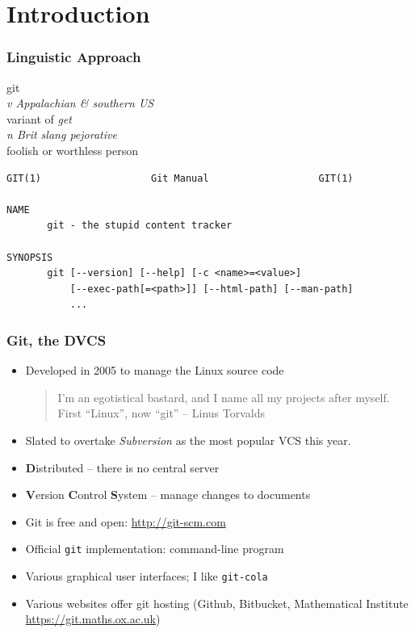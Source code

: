 
\section{Introduction}

\begin{frame}[fragile]
  \frametitle{Linguistic Approach}
  \vspace{-5mm}
  
  \begin{block}{}
    git \\
    \textit{v Appalachian \& southern US}\\
    \hspace{1cm} variant of \emph{get}\\
    \textit{n Brit slang pejorative}\\
    \hspace{1cm} foolish or worthless person
  \end{block}
  \bigskip
  \pause

  \small
\begin{verbatim}
GIT(1)                   Git Manual                   GIT(1)

NAME
       git - the stupid content tracker

SYNOPSIS
       git [--version] [--help] [-c <name>=<value>]
           [--exec-path[=<path>]] [--html-path] [--man-path]
           ...
\end{verbatim}

\end{frame}


\begin{frame}
  \frametitle{Git, the DVCS}

  \begin{itemize}
  \item 
    Developed in 2005 to manage the Linux source code
    \begin{quote}
      I'm an egotistical bastard, and I name all my projects after
      myself. First ``Linux'', now ``git'' -- Linus Torvalds
    \end{quote}
  \item Slated to overtake \emph{Subversion} as the most popular VCS
    this year.
  \item \textbf{D}istributed -- there is no central server
  \item \textbf{V}ersion \textbf{C}ontrol \textbf{S}ystem -- manage
    changes to documents
  \item Git is free and open: \url{http://git-scm.com}
  \item Official \texttt{git} implementation: command-line program
  \item Various graphical user interfaces; I like \texttt{git-cola}
  \item Various websites offer git hosting (Github, Bitbucket,
    Mathematical Institute \url{https://git.maths.ox.ac.uk})
  \end{itemize}

\end{frame}



